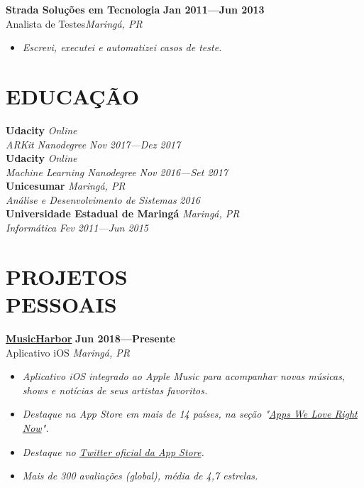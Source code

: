 \documentclass[line,margin]{res}
\begin{document}
\begin{resume}
  {\bf Strada Solu\c{c}\~oes em Tecnologia} \hfill {\bf Jan 2011---Jun 2013} \\
  Analista de Testes\hfill {\sl Maring\'a, PR}\\[-6pt]
    \begin{itemize}
    \item {\sl Escrevi, executei e automatizei casos de teste.}
  \end{itemize}


\section{EDUCAÇÃO}
  {\bf Udacity} \hfill {\sl Online} \\
  {\sl ARKit Nanodegree} \hfill {\sl Nov 2017---Dez 2017}\\[6pt]
  {\bf Udacity} \hfill {\sl Online} \\
  {\sl Machine Learning Nanodegree} \hfill {\sl Nov 2016---Set 2017}\\[6pt]
  {\bf Unicesumar} \hfill {\sl Maring\'a, PR} \\
  {\sl Análise e Desenvolvimento de Sistemas} \hfill {\sl 2016}\\[6pt]
  {\bf Universidade Estadual de Maringá} \hfill {\sl Maring\'a, PR} \\
  {\sl Informática} \hfill {\sl Fev 2011---Jun 2015}


\section{PROJETOS \\ PESSOAIS}
  {\bf \href{https://apps.apple.com/us/app/musicharbor/id1440405750}{MusicHarbor}} \hfill {\bf Jun 2018---Presente} \\
  Aplicativo iOS \hfill {\sl Maring\'a, PR}\\[-6pt]
    \begin{itemize}
    \item {\sl Aplicativo iOS integrado ao Apple Music para acompanhar novas músicas, shows e notícias de seus artistas favoritos.}
    \item {\sl Destaque na App Store em mais de 14 países, na seção "\href{https://github.com/marcosatanaka/resume-latex/blob/master/images/apps_we_love_right_now.png?raw=true}{Apps We Love Right Now}".}
    \item {\sl Destaque no \href{https://twitter.com/AppStore/status/1199720843053535237}{Twitter oficial da App Store}.}
    \item {\sl Mais de 300 avaliações (global), média de 4,7 estrelas.}
    \end{itemize}
  

\end{resume}
\end{document}
